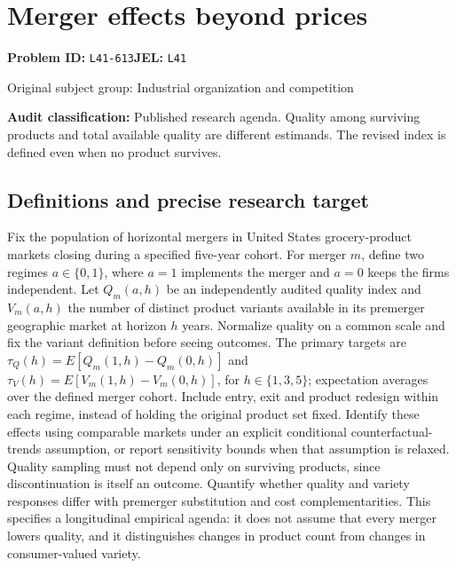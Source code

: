 \documentclass[11pt,a4paper]{article}
\begin{document}
\section*{Merger effects beyond prices}
\textbf{Problem ID:} \texttt{L41-613}\quad \textbf{JEL:} \texttt{L41}\par
\label{problem:OP-0393}
{\sffamily\small\color{muted}Original subject group: Industrial organization and competition\par}
\label{definitions:problem:30007675}
\textbf{Audit classification:} Published research agenda. Quality among surviving products and total available quality are different estimands. The revised index is defined even when no product survives.
\subsection*{Definitions and precise research target}
Fix the population of horizontal mergers in United States grocery-product markets closing during a specified five-year cohort. For merger \(m\), define two regimes \(a\in\{0,1\}\), where \(a=1\) implements the merger and \(a=0\) keeps the firms independent. Let \(Q_m(a,h)\) be an independently audited quality index and \(V_m(a,h)\) the number of distinct product variants available in its premerger geographic market at horizon \(h\) years. Normalize quality on a common scale and fix the variant definition before seeing outcomes. The primary targets are \(\tau_Q(h)=E[Q_m(1,h)-Q_m(0,h)]\) and \(\tau_V(h)=E[V_m(1,h)-V_m(0,h)]\), for \(h\in\{1,3,5\}\); expectation averages over the defined merger cohort. Include entry, exit and product redesign within each regime, instead of holding the original product set fixed. Identify these effects using comparable markets under an explicit conditional counterfactual-trends assumption, or report sensitivity bounds when that assumption is relaxed. Quality sampling must not depend only on surviving products, since discontinuation is itself an outcome. Quantify whether quality and variety responses differ with premerger substitution and cost complementarities. This specifies a longitudinal empirical agenda: it does not assume that every merger lowers quality, and it distinguishes changes in product count from changes in consumer-valued variety.
\end{document}
